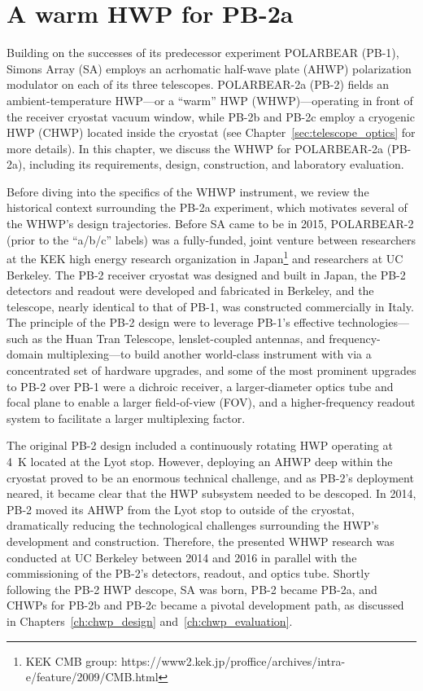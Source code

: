 \chapter[PB-2a WHWP]{A warm HWP for PB-2a}
\label{ch:pb2a_whwp}

Building on the successes of its predecessor experiment POLARBEAR (PB-1), Simons Array (SA) employs an acrhomatic half-wave plate (AHWP) polarization modulator on each of its three telescopes. POLARBEAR-2a (PB-2) fields an ambient-temperature HWP---or a ``warm'' HWP (WHWP)---operating in front of the receiver cryostat vacuum window, while PB-2b and PB-2c employ a cryogenic HWP (CHWP) located inside the cryostat (see Chapter~\ref{sec:telescope_optics} for more details). In this chapter, we discuss the WHWP for POLARBEAR-2a (PB-2a), including its requirements, design, construction, and laboratory evaluation.

Before diving into the specifics of the WHWP instrument, we review the historical context surrounding the PB-2a experiment, which motivates several of the WHWP's design trajectories. Before SA came to be in 2015, POLARBEAR-2 (prior to the ``a/b/c'' labels) was a fully-funded, joint venture between researchers at the KEK high energy research organization in Japan\footnote{KEK CMB group: https://www2.kek.jp/proffice/archives/intra-e/feature/2009/CMB.html} and researchers at UC Berkeley. The PB-2 receiver cryostat was designed and built in Japan, the PB-2 detectors and readout were developed and fabricated in Berkeley, and the telescope, nearly identical to that of PB-1, was constructed commercially in Italy. The principle of the PB-2 design were to leverage PB-1's effective technologies---such as the Huan Tran Telescope, lenslet-coupled antennas, and frequency-domain multiplexing---to build another world-class instrument with via a concentrated set of hardware upgrades, and some of the most prominent upgrades to PB-2 over PB-1 were a dichroic receiver, a larger-diameter optics tube and focal plane to enable a larger field-of-view (FOV), and a higher-frequency readout system to facilitate a larger multiplexing factor.

The original PB-2 design included a continuously rotating HWP operating at 4~K located at the Lyot stop. However, deploying an AHWP deep within the cryostat proved to be an enormous technical challenge, and as PB-2's deployment neared, it became clear that the HWP subsystem needed to be descoped. In 2014, PB-2 moved its AHWP from the Lyot stop to outside of the cryostat, dramatically reducing the technological challenges surrounding the HWP's development and construction. Therefore, the presented WHWP research was conducted at UC Berkeley between 2014 and 2016 in parallel with the commissioning of the PB-2's detectors, readout, and optics tube. Shortly following the PB-2 HWP descope, SA was born, PB-2 became PB-2a, and CHWPs for PB-2b and PB-2c became a pivotal development path, as discussed in Chapters~\ref{ch:chwp_design} and~\ref{ch:chwp_evaluation}.

